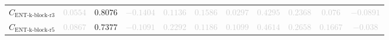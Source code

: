 \documentclass{standalone}
\newcommand{\entkblockrthreename}{\text{ENT-k-block-r3}}
\newcommand{\entkblockrthree}{C_{\entkblockrthreename}}
\newcommand{\entkblockrfivename}{\text{ENT-k-block-r5}}
\newcommand{\entkblockrfive}{C_{\entkblockrfivename}}
\begin{document}
\begin{tabular}{lcccccccccc}
$\entkblockrthree$ & \textcolor{lightgray}{$0.0554$} & $0.8076$ & \textcolor{lightgray}{$-0.1404$} & \textcolor{lightgray}{$0.1136$} & \textcolor{lightgray}{$0.1586$} & \textcolor{lightgray}{$0.0297$} & \textcolor{lightgray}{$0.4295$} & \textcolor{lightgray}{$0.2368$} & \textcolor{lightgray}{$0.076$} & \textcolor{lightgray}{$-0.0891$} \\ 
$\entkblockrfive$ & \textcolor{lightgray}{$0.0867$} & $0.7377$ & \textcolor{lightgray}{$-0.1091$} & \textcolor{lightgray}{$0.2292$} & \textcolor{lightgray}{$0.1186$} & \textcolor{lightgray}{$0.1099$} & \textcolor{lightgray}{$0.4614$} & \textcolor{lightgray}{$0.2658$} & \textcolor{lightgray}{$0.1667$} & \textcolor{lightgray}{$-0.038$} \\ 
\bottomrule
\end{tabular}
\end{document}
